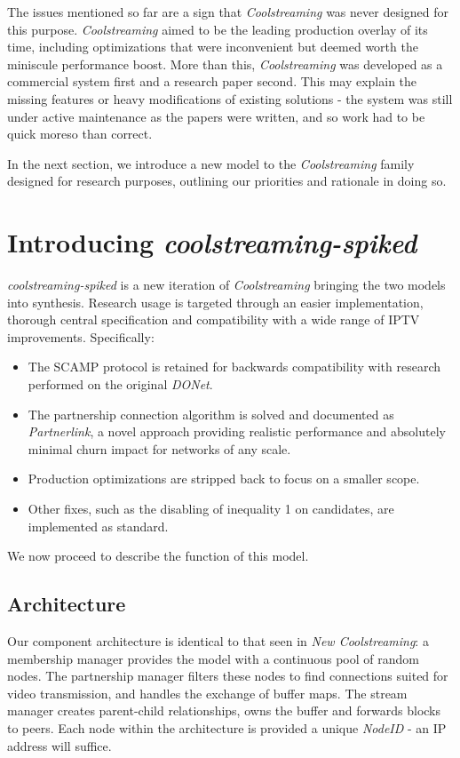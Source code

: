 \documentclass[12pt,a4paper]{article}
\begin{document}
The issues mentioned so far are a sign that \textit{Coolstreaming} was never designed for this purpose. \textit{Coolstreaming} aimed to be the leading production overlay of its time, including optimizations that were inconvenient but deemed worth the miniscule performance boost. More than this, \textit{Coolstreaming} was developed as a commercial system first and a research paper second. This may explain the missing features or heavy modifications of existing solutions - the system was still under active maintenance as the papers were written, and so work had to be quick moreso than correct.

In the next section, we introduce a new model to the \textit{Coolstreaming} family designed for research purposes, outlining our priorities and rationale in doing so.

\section{Introducing \textit{coolstreaming-spiked}}
\textit{coolstreaming-spiked} is a new iteration of \textit{Coolstreaming} bringing the two models into synthesis. Research usage is targeted through an easier implementation, thorough central specification and compatibility with a wide range of IPTV improvements. Specifically:

\begin{itemize}
	\item The SCAMP protocol is retained for backwards compatibility with research performed on the original \textit{DONet}.
	\item The partnership connection algorithm is solved and documented as \textit{Partnerlink}, a novel approach providing realistic performance and absolutely minimal churn impact for networks of any scale.
	\item Production optimizations are stripped back to focus on a smaller scope.
	\item Other fixes, such as the disabling of inequality 1 on candidates, are implemented as standard.
\end{itemize}

We now proceed to describe the function of this model.

\subsection{Architecture}
Our component architecture is identical to that seen in \textit{New Coolstreaming}: a membership manager provides the model with a continuous pool of random nodes. The partnership manager filters these nodes to find connections suited for video transmission, and handles the exchange of buffer maps. The stream manager creates parent-child relationships, owns the buffer and forwards blocks to peers. Each node within the architecture is provided a unique \textit{NodeID} - an IP address will suffice.
\end{document}

